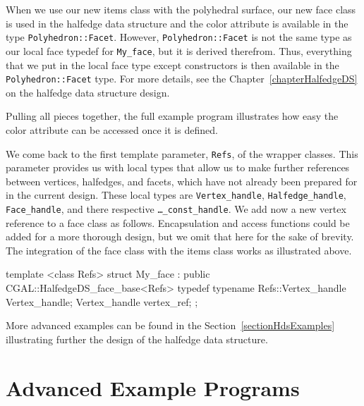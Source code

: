 When we use our new items class with the polyhedral surface, our new
face class is used in the halfedge data structure and the color
attribute is available in the type \texttt{Polyhedron::Facet}. However,
\texttt{Polyhedron::Facet} is not the same type as our local face 
typedef for \texttt{My\_face}, but it is derived therefrom. Thus,
everything that we put in the local face type except constructors is
then available in the \texttt{Polyhedron::Facet} type. For more
details, see the Chapter~\ref{chapterHalfedgeDS} on the halfedge data
structure design.

Pulling all pieces together, the full example program illustrates how easy
the color attribute can be accessed once it is defined.


We come back to the first template parameter, \texttt{Refs}, of the
wrapper classes. This parameter provides us with local types that
allow us to make further references between vertices, halfedges, and
facets, which have not already been prepared for in the current
design. These local types are \texttt{Vertex\_handle},
\texttt{Halfedge\_handle}, \texttt{Face\_handle}, and there respective
\texttt{\ldots\_const\_handle}. We add now a new vertex reference to a
face class as follows. Encapsulation and access functions could be
added for a more thorough design, but we omit that here for the sake
of brevity. The integration of the face class with the items class
works as illustrated above.

\begin{ccExampleCode}
template <class Refs>
struct My_face : public CGAL::HalfedgeDS_face_base<Refs> {
    typedef typename Refs::Vertex_handle Vertex_handle;
    Vertex_handle vertex_ref;
};
\end{ccExampleCode}

More advanced examples can be found in the Section~\ref{sectionHdsExamples}
illustrating further the design of the halfedge data structure.


\section{Advanced Example Programs}
\label{sectionPolyAdvanced}

